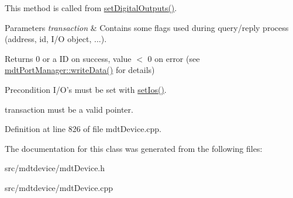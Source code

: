 This method is called from \hyperlink{classmdt_device_ae68a400d5f27fe142d41b674f473bf98}{setDigitalOutputs()}.


\begin{DoxyParams}{Parameters}
{\em transaction} & Contains some flags used during query/reply process (address, id, I/O object, ...). \\
\hline
\end{DoxyParams}
\begin{DoxyReturn}{Returns}
0 or a ID on success, value $<$ 0 on error (see \hyperlink{classmdt_port_manager_a8b60d53d6e553f15dedec916f9c1614b}{mdtPortManager::writeData()} for details) 
\end{DoxyReturn}
\begin{DoxyPrecond}{Precondition}
I/O's must be set with \hyperlink{classmdt_device_a9f1de62ef54974b0636dee673bd819e2}{setIos()}. 

transaction must be a valid pointer. 
\end{DoxyPrecond}


Definition at line 826 of file mdtDevice.cpp.



The documentation for this class was generated from the following files:\begin{DoxyCompactItemize}
\item 
src/mdtdevice/mdtDevice.h\item 
src/mdtdevice/mdtDevice.cpp\end{DoxyCompactItemize}
